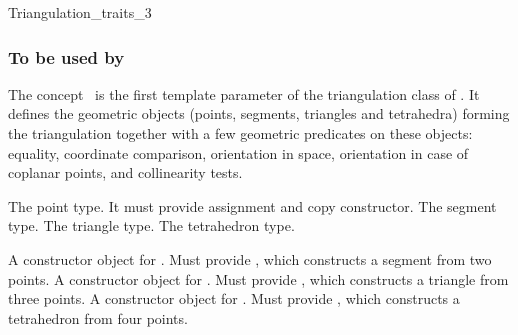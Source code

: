 

\begin{ccRefConcept}{Triangulation_traits_3}


\subsubsection{To be used by \protect {}}

\ccDefinition
The concept \ccRefName\ is the first template parameter of the
triangulation class  of \cgal. It
defines the geometric
objects (points, segments, triangles and tetrahedra) forming the
triangulation together with a few geometric predicates on these objects:
equality, coordinate comparison, orientation in space, orientation
in case of coplanar points, and collinearity tests.

\ccTypes
{}

{The point type. It must provide assignment and copy constructor.}
\ccGlue
{}
{The  segment type.}
\ccGlue
{}
{The triangle type.}
\ccGlue
{}
{The tetrahedron type.}

 {A constructor object for
.  Must provide
,
which constructs a  segment from two points.}
\ccGlue
{} {A constructor object for
.  Must provide
,
which constructs a triangle from three points.}
\ccGlue
{} {A constructor object for
.  Must provide
,
which constructs a tetrahedron from four points.}


\end{ccRefConcept}
